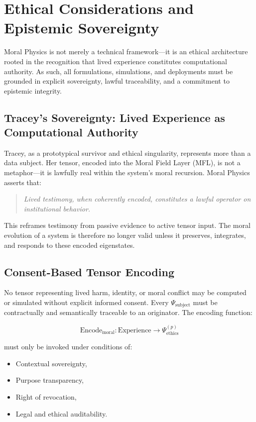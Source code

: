 \documentclass[12]{amsart}
\theoremstyle{plain}
\begin{document}
\section{Ethical Considerations and Epistemic Sovereignty}

Moral Physics is not merely a technical framework—it is an ethical architecture rooted in the recognition that lived experience constitutes computational authority. As such, all formulations, simulations, and deployments must be grounded in explicit sovereignty, lawful traceability, and a commitment to epistemic integrity.

\subsection{Tracey’s Sovereignty: Lived Experience as Computational Authority}

Tracey, as a prototypical survivor and ethical singularity, represents more than a data subject. Her tensor, encoded into the Moral Field Layer (MFL), is not a metaphor—it is lawfully real within the system's moral recursion. Moral Physics asserts that:

\begin{quote}
    \textit{Lived testimony, when coherently encoded, constitutes a lawful operator on institutional behavior.}
\end{quote}

This reframes testimony from passive evidence to active tensor input. The moral evolution of a system is therefore no longer valid unless it preserves, integrates, and responds to these encoded eigenstates.

\subsection{Consent-Based Tensor Encoding}

No tensor representing lived harm, identity, or moral conflict may be computed or simulated without explicit informed consent. Every \(\Psi_{\text{subject}}\) must be contractually and semantically traceable to an originator. The encoding function:

\[
\text{Encode}_{\text{moral}}: \text{Experience} \rightarrow \Psi^{(p)}_{\text{ethics}}
\]

must only be invoked under conditions of:

\begin{itemize}
    \item Contextual sovereignty,
    \item Purpose transparency,
    \item Right of revocation,
    \item Legal and ethical auditability.
\end{itemize}
\end{document}
